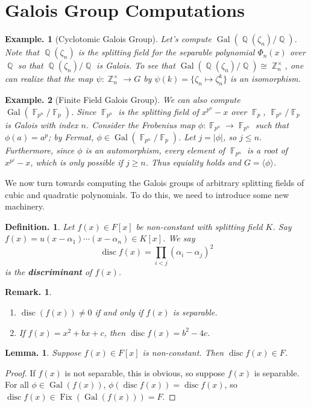 \documentclass[11pt, a4paper]{memoir}
\DeclareMathOperator{\Q}{{\mathbb{Q}}}
\DeclareMathOperator{\Z}{{\mathbb{Z}}}
\DeclareMathOperator{\F}{{\mathbb{F}}}
\newcommand{\mbf}[1]{{\boldmath\bfseries #1}}
\theoremstyle{change}
\newtheorem{lemma}[theorem]{Lemma.}
\theoremstyle{plain}
\theoremstyle{nonumberplain}
\newtheorem{definition}{Definition.}
\newtheorem{example}{Example.}
\newtheorem{remark}{Remark.}
\newtheorem{proof}{Proof}
\DeclareMathOperator{\disc}{disc}
\DeclareMathOperator{\Fix}{Fix}
\DeclareMathOperator{\Gal}{Gal}
\numberwithin{equation}{section}
\begin{document}
\section{Galois Group Computations}
\begin{example}[Cyclotomic Galois Group]
    Let's compute $\Gal(\Q(\zeta_n)/\Q)$.
    Note that $\Q(\zeta_n)$ is the splitting field for the separable polynomial $\Phi_n(x)$ over $\Q$ so that $\Q(\zeta_n)/\Q$ is Galois.
    To see that $\Gal(\Q(\zeta_n)/\Q)\cong\Z_n^\times$, one can realize that the map $\psi:\Z_n^\times\to G$ by $\psi(k)=\{\zeta_n\mapsto\zeta_n^k\}$ is an isomorphism.
\end{example}
\begin{example}[Finite Field Galois Group]
    We can also compute $\Gal(\F_{p^n}/\F_p)$.
    Since $\F_{p^n}$ is the splitting field of $x^{p^n}-x$ over $\F_p$, $\F_{p^n}/\F_p$ is Galois with index $n$.
    Consider the Frobenius map $\phi:\F_{p^n}\to \F_{p^n}$ such that $\phi(a)=a^p$; by Fermat, $\phi\in\Gal(\F_{p^n}/\F_p)$.
    Let $j=|\phi|$, so $j\leq n$.
    Furthermore, since $\phi$ is an automorphism, every element of $\F_{p^n}$ is a root of $x^{p^j}-x$, which is only possible if $j\geq n$.
    Thus equiality holds and $G=\langle\phi\rangle$.
\end{example}
We now turn towards computing the Galois groups of arbitrary splitting fields of cubic and quadratic polynomials.
To do this, we need to introduce some new machinery.
\begin{definition}
    Let $f(x)\in F[x]$ be non-constant with splitting field $K$.
    Say $f(x)=u(x-\alpha_1)\cdots(x-\alpha_n)\in K[x]$.
    We say
    \begin{equation*}
        \disc f(x)=\prod_{i<j}(\alpha_i-\alpha_j)^2
    \end{equation*}
    is the \mbf{discriminant} of $f(x)$.
\end{definition}
\begin{remark}
    \begin{enumerate}[nl,r]
        \item $\disc(f(x))\neq 0$ if and only if $f(x)$ is separable.
        \item If $f(x)=x^2+bx+c$, then $\disc f(x)=b^2-4c$.
    \end{enumerate}
\end{remark}
\begin{lemma}
    Suppose $f(x)\in F[x]$ is non-constant.
    Then $\disc f(x)\in F$.
\end{lemma}
\begin{proof}
    If $f(x)$ is not separable, this is obvious, so suppose $f(x)$ is separable.
    For all $\phi\in\Gal(f(x))$, $\phi(\disc f(x))=\disc f(x)$, so $\disc f(x)\in\Fix(\Gal(f(x)))=F$.
\end{proof}
\end{document}
